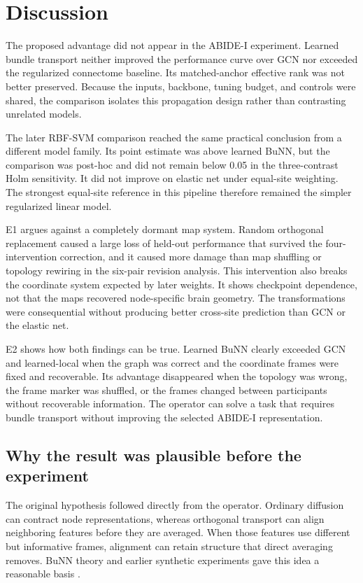 \documentclass[11pt,a4paper]{article}
\begin{document}
\section{Discussion}

The proposed advantage did not appear in the ABIDE-I experiment. Learned
bundle transport neither improved the performance curve over GCN nor exceeded
the regularized connectome baseline. Its matched-anchor effective rank was not
better preserved. Because the inputs, backbone, tuning budget, and controls
were shared, the comparison isolates this propagation design rather than
contrasting unrelated models.

The later RBF-SVM comparison reached the same practical conclusion from a
different model family. Its point estimate was above learned BuNN, but the
comparison was post-hoc and did not remain below 0.05 in the three-contrast
Holm sensitivity. It did not improve on elastic net under equal-site weighting.
The strongest equal-site reference in this pipeline therefore remained the
simpler regularized linear model.

E1 argues against a completely dormant map system. Random orthogonal
replacement caused a large loss of held-out performance that survived the
four-intervention correction, and it caused more damage than map shuffling or
topology rewiring in the six-pair revision analysis. This intervention also
breaks the coordinate system expected by later weights. It shows checkpoint
dependence, not that the maps recovered node-specific brain geometry. The
transformations were consequential without producing better cross-site
prediction than GCN or the elastic net.

E2 shows how both findings can be true. Learned BuNN clearly exceeded GCN and
learned-local when the graph was correct and the coordinate frames were fixed
and recoverable. Its advantage disappeared when the topology was wrong, the
frame marker was shuffled, or the frames changed between participants without
recoverable information. The operator can solve a task that requires bundle
transport without improving the selected ABIDE-I representation.

\subsection{Why the result was plausible before the experiment}

The original hypothesis followed directly from the operator. Ordinary
diffusion can contract node representations, whereas orthogonal transport can
align neighboring features before they are averaged. When those features use
different but informative frames, alignment can retain structure that direct
averaging removes. BuNN theory and earlier synthetic experiments gave this
idea a reasonable basis \cite{bamberger2025bundle}.
\end{document}

